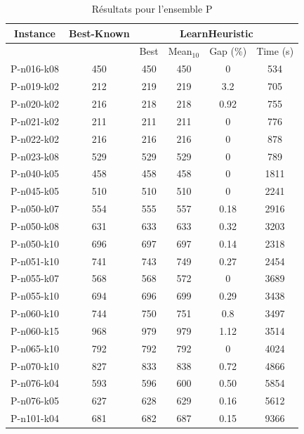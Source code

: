 \documentclass[a4paper,11pt]{article}%
\begin{document}
\begin{table}[h!]
\caption{Résultats pour l'ensemble P}
\label{TP}
\begin{center}
\begin{tabular}{|@{}c@{}|@{}c@{}|@{}c@{}|@{}c@{}|@{}c@{}|@{}c@{}|}

\hline
 Instance & Best-Known & \multicolumn{4}{c|}{LearnHeuristic}  \\
 \hline
 & & Best & Mean$_{10}$ & Gap (\%) & Time (s) \\ 
 \hline
 P-n016-k08 & 450 & 450 & 450 & 0 & 534  \\
 \hline
 P-n019-k02   & 212 & 219 & 219 & 3.2 & 705   \\
  \hline
   P-n020-k02 & 216 & 218 & 218 &0.92 & 755  \\
 \hline
   P-n021-k02 & 211 & 211 & 211 &0 & 776  \\
  \hline
   P-n022-k02 & 216 & 216 & 216 & 0 & 878  \\
 \hline
  P-n023-k08  & 529 & 529 & 529 & 0 & 789  \\
  \hline
  P-n040-k05 & 458 & 458 & 458 & 0 & 1811 \\
 \hline
  P-n045-k05  & 510 & 510 & 510 & 0 & 2241 \\
 \hline
 P-n050-k07 & 554 & 555 & 557 & 0.18 & 2916 \\
 \hline
  P-n050-k08  & 631 & 633 & 633 & 0.32 & 3203   \\
 \hline
   P-n050-k10 & 696 & 697 & 697 & 0.14 & 2318   \\
  \hline
   P-n051-k10 & 741 & 743 & 749 & 0.27 & 2454  \\
 \hline 
  P-n055-k07  & 568 & 568& 572& 0&3689  \\
  \hline
  P-n055-k10  & 694 & 696 & 699 &0.29 & 3438  \\
  \hline
  P-n060-k10 & 744 & 750 & 751 & 0.8 & 3497  \\
 \hline
   P-n060-k15  & 968 & 979 & 979 &1.12 & 3514   \\
  \hline
  P-n065-k10  & 792 & 792 & 792 & 0 & 4024   \\
  \hline
  P-n070-k10 & 827 & 833 & 838 & 0.72 & 4866    \\
  \hline
  P-n076-k04 & 593 & 596 &600 & 0.50 & 5854 \\
 \hline 
   P-n076-k05 & 627 & 628 & 629 &0.16 & 5612   \\
  \hline 
  P-n101-k04  & 681 & 682 & 687 & 0.15 & 9366  \\
  \hline
\end{tabular}
\end{center}
\end{table}
\end{document}
